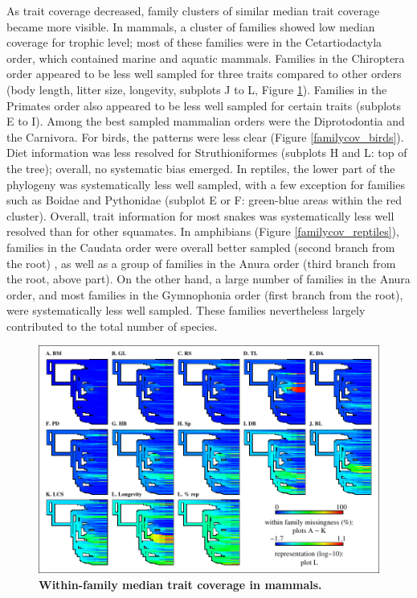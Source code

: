 As trait coverage decreased, family clusters of similar median trait coverage became more visible. In mammals, a cluster of families showed low median coverage for trophic level; most of these families were in the Cetartiodactyla order, which contained marine and aquatic mammals. Families in the Chiroptera order appeared to be less well sampled for three traits compared to other orders (body length, litter size, longevity, subplots J to L, Figure \ref{familycov_mammals}). Families in the Primates order also appeared to be less well sampled for certain traits (subplots E to I). Among the best sampled mammalian orders were the Diprotodontia and the Carnivora. For birds, the patterns were less clear (Figure \ref{familycov_birds}). Diet information was less resolved for Struthioniformes (subplots H and L: top of the tree); overall, no systematic bias emerged.
 In reptiles, the lower part of the phylogeny was systematically less well sampled, with a few exception for families such as Boidae and Pythonidae (subplot E or F: green-blue areas within the red cluster). Overall, trait information for most snakes was systematically less well resolved than for other squamates.
In amphibians (Figure \ref{familycov_reptiles}), families in the Caudata order were overall better sampled  (second branch from the root) , as well as a group of families in the Anura order (third branch from the root, above part). On the other hand, a large number of families in the Anura order, and most families in the Gymnophonia order (first branch from the root), were systematically less well sampled. These families nevertheless largely contributed to the total number of species. 

\pagebreak

\begin{figure}[h!]
\centering
\includegraphics[scale=1]{figures/chapter2/NA_phylo_patterns/Mammals_coverage}
\caption[Within-family median trait coverage in mammals]{\textbf{Within-family median trait coverage in mammals.}}
\label{familycov_mammals}
\end{figure}

